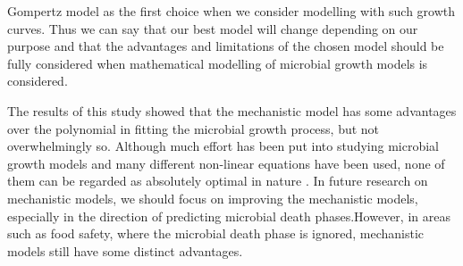 \documentclass[11pt]{article}
\begin{document}
\begin{linenumbers}
Gompertz model as the first choice when we consider modelling with such growth curves. Thus we can say that our best model will change depending on our purpose and that the advantages and limitations of the chosen model should be fully considered when mathematical modelling of microbial growth models is considered.
      
    The results of this study showed that the mechanistic model has some advantages over the polynomial in fitting the microbial growth process, but not overwhelmingly so. Although much effort has been put into studying microbial growth models and many different non-linear equations have been used, none of them can be regarded as absolutely optimal in nature \cite{lopez2004statistical}. In future research on mechanistic models, we should focus on improving the mechanistic models, especially in the direction of predicting microbial death phases.However, in areas such as food safety, where the microbial death phase is ignored, mechanistic models still have some distinct advantages.

    

    

    \end{linenumbers}
\end{document}
